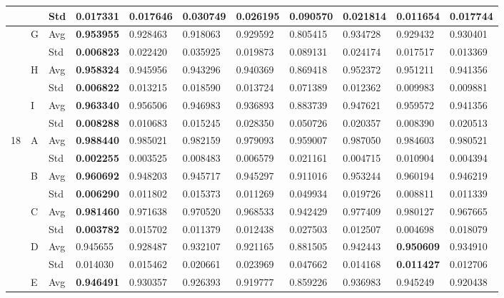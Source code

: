 \documentclass{article} %
\begin{document}
\begin{tabular}{|p{0.4in}|p{0.4in}|p{0.3in}|p{0.5in}|p{0.5in}|p{0.5in}|p{0.5in}|p{0.5in}|p{0.5in}|p{0.5in}|p{0.5in}|}
 &  & Std & 0.017331  & 0.017646  & 0.030749  & 0.026195  & 0.090570  & 0.021814  & \textbf{0.011654 } & 0.017744  \\ \hline 
 & G & Avg & \textbf{0.953955 } & 0.928463  & 0.918063  & 0.929592  & 0.805415  & 0.934728  & 0.929432  & 0.930401  \\ \hline 
 &  & Std & \textbf{0.006823 } & 0.022420  & 0.035925  & 0.019873  & 0.089131  & 0.024174  & 0.017517  & 0.013369  \\ \hline 
 & H & Avg & \textbf{0.958324 } & 0.945956  & 0.943296  & 0.940369  & 0.869418  & 0.952372  & 0.951211  & 0.941356  \\ \hline 
 &  & Std & \textbf{0.006822 } & 0.013215  & 0.018590  & 0.013724  & 0.071389  & 0.012362  & 0.009983  & 0.009881  \\ \hline 
 & I & Avg & \textbf{0.963340 } & 0.956506  & 0.946983  & 0.936893  & 0.883739  & 0.947621  & 0.959572  & 0.941356  \\ \hline 
 &  & Std & \textbf{0.008288 } & 0.010683  & 0.015245  & 0.028350  & 0.050726  & 0.020357  & 0.008390  & 0.020513  \\ \hline 
18 & A & Avg & \textbf{0.988440 } & 0.985021  & 0.982159  & 0.979093  & 0.959007  & 0.987050  & 0.984603  & 0.980521  \\ \hline 
 &  & Std & \textbf{0.002255 } & 0.003525  & 0.008483  & 0.006579  & 0.021161  & 0.004715  & 0.010904  & 0.004394  \\ \hline 
 & B & Avg & \textbf{0.960692 } & 0.948203  & 0.945717  & 0.945297  & 0.911016  & 0.953244  & 0.960194  & 0.946219  \\ \hline 
 &  & Std & \textbf{0.006290 } & 0.011802  & 0.015373  & 0.011269  & 0.049934  & 0.019726  & 0.008811  & 0.011339  \\ \hline 
 & C & Avg & \textbf{0.981460 } & 0.971638  & 0.970520  & 0.968533  & 0.942429  & 0.977409  & 0.980127  & 0.967665  \\ \hline 
 &  & Std & \textbf{0.003782 } & 0.015702  & 0.011379  & 0.012438  & 0.027503  & 0.012507  & 0.004698  & 0.018079  \\ \hline 
 & D & Avg & 0.945655  & 0.928487  & 0.932107  & 0.921165  & 0.881505  & 0.942443  & \textbf{0.950609 } & 0.934910  \\ \hline 
 &  & Std & 0.014030  & 0.015462  & 0.020661  & 0.023969  & 0.047662  & 0.014168  & \textbf{0.011427 } & 0.012706  \\ \hline 
 & E & Avg & \textbf{0.946491 } & 0.930357  & 0.926393  & 0.919777  & 0.859226  & 0.936983  & 0.945249  & 0.920438  \\ \hline 

\end{tabular}
\end{document}
